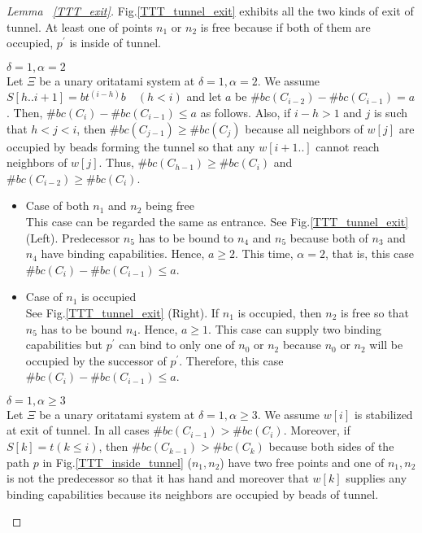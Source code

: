 \begin{proof}[Lemma~ \ref{TTT_exit}]
Fig.\ref{TTT_tunnel_exit} exhibits all the two kinds of exit of tunnel. 
At least one of points $n_1$ or $n_2$ is free because if both of them are occupied, $p^\prime$ is inside of tunnel.

\begin{paragraph}{}
$\delta = 1, \alpha = 2$\\
Let $\Xi$ be a unary oritatami system at $\delta = 1, \alpha = 2$. We assume $S[h..i+1] = bt^{(i-h)}b \quad (h<i)$ and
let $a$ be $\#bc(C_{i-2}) - \#bc(C_{i-1}) = a$. Then, $\#bc(C_{i}) - \#bc(C_{i-1}) \leq a$ as follows. Also, if $i - h > 1$ and $j$ is such that $h<j<i$, then $\#bc(C_{j-1}) \geq \#bc(C_{j})$ because all neighbors of $w[j]$ are occupied by beads forming the tunnel so that any $w[i+1..]$ cannot reach neighbors of $w[j]$. Thus, $\#bc(C_{h-1}) \geq \#bc(C_i)$ and $\#bc(C_{i-2}) \geq \#bc(C_i)$.
\end{paragraph}

\begin{itemize}
\item{Case of both $n_1$ and $n_2$ being free}\\
  This case can be regarded the same as entrance. See Fig.\ref{TTT_tunnel_exit} (Left). Predecessor $n_5$ has to be bound to $n_4$ and $n_5$ because both of $n_3$ and $n_4$ have binding capabilities. Hence, $a \geq 2$. This time, $\alpha = 2$, that is, this case $\#bc(C_{i}) - \#bc(C_{i-1}) \leq a$.
  
\item{Case of $n_1$ is occupied}\\
  See Fig.\ref{TTT_tunnel_exit} (Right). If $n_1$ is occupied, then $n_2$ is free so that $n_5$ has to be bound $n_4$. Hence,  $a \geq 1$. This case can supply two binding capabilities but $p^\prime$ can bind to only one of $n_0$ or $n_2$ because $n_0$ or $n_2$ will be occupied by the successor of $p^\prime$. Therefore, this case $\#bc(C_{i}) - \#bc(C_{i-1}) \leq a$.
  
\end{itemize}

\begin{paragraph}{}
$\delta = 1, \alpha \geq 3$\\
Let $\Xi$ be a unary oritatami system at $\delta = 1, \alpha \geq 3$. We assume $w[i]$ is stabilized at exit of tunnel.
In all cases $\#bc(C_{i-1}) > \#bc(C_{i})$. Moreover, if $S[k] = t (k \leq i)$, then $\#bc(C_{k-1}) > \#bc(C_{k})$ because both sides of the path $p$ in Fig.\ref{TTT_inside_tunnel} ($n_1, n_2$) have two free points and one of $n_1, n_2$ is not the predecessor so that it has hand and moreover that $w[k]$ supplies any binding capabilities because its neighbors are occupied by beads of tunnel.
\end{paragraph}


\end{proof}
